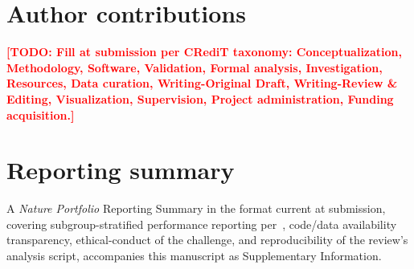 \documentclass[twoside,11pt]{article}
\newcommand{\todo}[1]{\textcolor{red}{\textbf{[TODO: #1]}}}
\begin{document}
\section*{Author contributions}

\todo{Fill at submission per CRediT taxonomy: Conceptualization, Methodology, Software, Validation, Formal analysis, Investigation, Resources, Data curation, Writing-Original Draft, Writing-Review \& Editing, Visualization, Supervision, Project administration, Funding acquisition.}

\section*{Reporting summary}

A \emph{Nature Portfolio} Reporting Summary in the format current at submission, covering subgroup-stratified performance reporting per~\citep{fda_aiml_2024}, code/data availability transparency, ethical-conduct of the challenge, and reproducibility of the review's analysis script, accompanies this manuscript as Supplementary Information.



\end{document}
